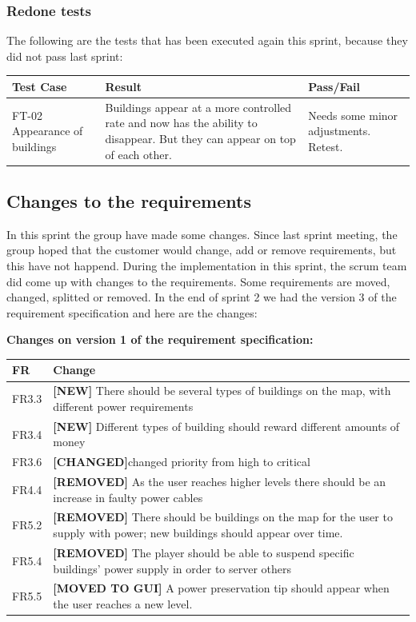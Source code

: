 	\subsubsection{Redone tests}

	The following are the tests that has been executed again this sprint, because they did not pass last sprint:

	\begin{tabular}{| p{2cm} | p{7cm} | p{3cm} |}
		\hline
		\rowcolor{lightgray}
		{\bf Test Case} & {\bf Result} & {\bf Pass/Fail} \\ \hline

		FT-02 Appearance of buildings & Buildings appear at a more controlled rate and now has the ability to disappear. But they can appear on top of each other. & Needs some minor adjustments. Retest. \\ \hline

	\end{tabular}

\subsection{Changes to the requirements}
	In this sprint the group have made some changes. Since last sprint meeting, 
	the group hoped that the customer would change, add or remove requirements, 
	but this have not happend. During the implementation in this sprint, the 
	scrum team did come up with changes to the requirements. 
	Some requirements are moved, changed, splitted or removed.
	In the end of sprint 2 we had the version 3 of the requirement specification 
	and here are the changes:


	{\bf Changes on version 1 of the requirement specification:} \\
	\begin{tabular}{| p{1.5cm} | p{12cm} |}
		\hline
		\rowcolor{lightgray}
		{\bf FR} & {\bf Change} \\ \hline
		FR3.3 & {\bf \color{green} [NEW]} There should be several types of buildings on the map, 
		with different power requirements  \\ \hline
		FR3.4 & {\bf \color{green} [NEW]} Different types of building should reward different amounts of 
		money \\ \hline
		FR3.6 & {\bf \color{orange} [CHANGED]}changed priority from high to critical \\ \hline
		FR4.4 & {\bf \color{red} [REMOVED]} As the user reaches higher levels there should be an 
		increase in faulty power cables \\ \hline
		FR5.2 & {\bf \color{red} [REMOVED]} There should be buildings on the map for the user to 
		supply with power; new buildings should appear over time. \\ \hline
		FR5.4 & {\bf \color{red} [REMOVED]} The player should be able to suspend specific buildings' 
		power supply in order to server others \\ \hline
		FR5.5 & {\bf \color{orange} [MOVED TO GUI]} A power preservation tip should appear when the 
		user reaches a new level. \\ \hline
	\end{tabular}

